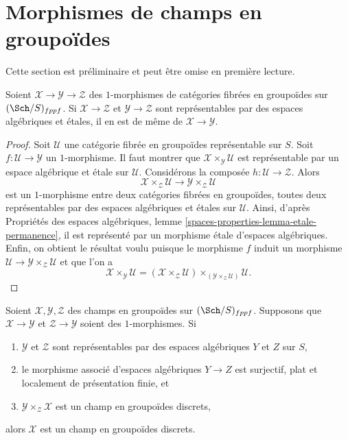 \section{Morphismes de champs en groupoïdes}
\label{section-1-morphisms}

\noindent
Cette section est préliminaire et peut être omise en première lecture.

\begin{lemma}
\label{lemma-etale-permanence}
Soient $\mathcal{X} \to \mathcal{Y} \to \mathcal{Z}$ des
$1$-morphismes de catégories fibrées en groupoïdes sur
$(\Sch/S)_{fppf}$.
Si $\mathcal{X} \to \mathcal{Z}$ et $\mathcal{Y} \to \mathcal{Z}$ sont
représentables par des espaces algébriques et étales, il en est de même de
$\mathcal{X} \to \mathcal{Y}$.
\end{lemma}

\begin{proof}
Soit $\mathcal{U}$ une catégorie fibrée en groupoïdes représentable sur $S$.
Soit $f : \mathcal{U} \to \mathcal{Y}$ un $1$-morphisme. Il faut montrer que
$\mathcal{X} \times_\mathcal{Y} \mathcal{U}$ est représentable par un
espace algébrique et étale sur $\mathcal{U}$.
Considérons la composée $h : \mathcal{U} \to \mathcal{Z}$. Alors
$$
\mathcal{X} \times_\mathcal{Z} \mathcal{U}
\longrightarrow
\mathcal{Y} \times_\mathcal{Z} \mathcal{U}
$$
est un $1$-morphisme entre deux catégories fibrées en groupoïdes, toutes deux
représentables par des espaces algébriques et étales sur $\mathcal{U}$.
Ainsi, d'après
Propriétés des espaces algébriques, lemme \ref{spaces-properties-lemma-etale-permanence},
il est représenté par un morphisme étale d'espaces algébriques.
Enfin, on obtient le résultat voulu puisque le morphisme $f$ induit
un morphisme $\mathcal{U} \to \mathcal{Y} \times_\mathcal{Z} \mathcal{U}$
et que l'on a
$$
\mathcal{X} \times_\mathcal{Y} \mathcal{U} =
(\mathcal{X} \times_\mathcal{Z} \mathcal{U})
\times_{(\mathcal{Y} \times_\mathcal{Z} \mathcal{U})}
\mathcal{U}.
$$
\end{proof}

\begin{lemma}
\label{lemma-stack-in-setoids-descent}
Soient $\mathcal{X}, \mathcal{Y}, \mathcal{Z}$ des champs en groupoïdes
sur $(\Sch/S)_{fppf}$. Supposons que $\mathcal{X} \to \mathcal{Y}$
et $\mathcal{Z} \to \mathcal{Y}$ soient des $1$-morphismes.
Si
\begin{enumerate}
\item $\mathcal{Y}$ et $\mathcal{Z}$ sont représentables par des espaces algébriques
$Y$ et $Z$ sur $S$,
\item le morphisme associé d'espaces algébriques $Y \to Z$ est surjectif,
plat et localement de présentation finie, et
\item $\mathcal{Y} \times_\mathcal{Z} \mathcal{X}$ est un champ en
groupoïdes discrets,
\end{enumerate}
alors $\mathcal{X}$ est un champ en groupoïdes discrets.
\end{lemma}

